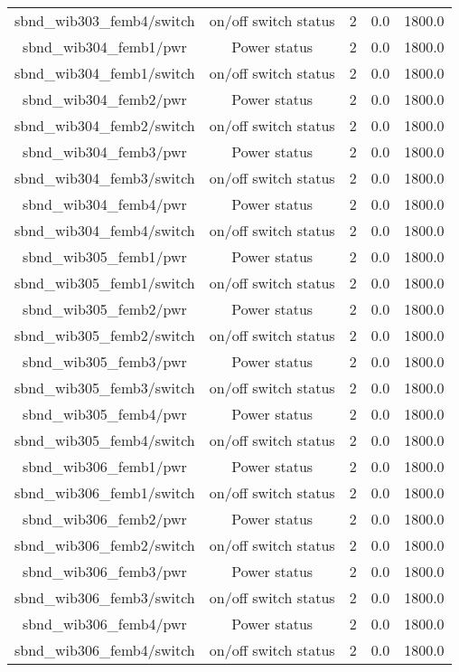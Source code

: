 \begin{table}[ptb]
\begin{tabular}{c | c c c c}
sbnd_wib303_femb4/switch & on/off switch status & 2 & 0.0 & 1800.0\\ 
sbnd_wib304_femb1/pwr & Power status & 2 & 0.0 & 1800.0\\ 
sbnd_wib304_femb1/switch & on/off switch status & 2 & 0.0 & 1800.0\\ 
sbnd_wib304_femb2/pwr & Power status & 2 & 0.0 & 1800.0\\ 
sbnd_wib304_femb2/switch & on/off switch status & 2 & 0.0 & 1800.0\\ 
sbnd_wib304_femb3/pwr & Power status & 2 & 0.0 & 1800.0\\ 
sbnd_wib304_femb3/switch & on/off switch status & 2 & 0.0 & 1800.0\\ 
sbnd_wib304_femb4/pwr & Power status & 2 & 0.0 & 1800.0\\ 
sbnd_wib304_femb4/switch & on/off switch status & 2 & 0.0 & 1800.0\\ 
sbnd_wib305_femb1/pwr & Power status & 2 & 0.0 & 1800.0\\ 
sbnd_wib305_femb1/switch & on/off switch status & 2 & 0.0 & 1800.0\\ 
sbnd_wib305_femb2/pwr & Power status & 2 & 0.0 & 1800.0\\ 
sbnd_wib305_femb2/switch & on/off switch status & 2 & 0.0 & 1800.0\\ 
sbnd_wib305_femb3/pwr & Power status & 2 & 0.0 & 1800.0\\ 
sbnd_wib305_femb3/switch & on/off switch status & 2 & 0.0 & 1800.0\\ 
sbnd_wib305_femb4/pwr & Power status & 2 & 0.0 & 1800.0\\ 
sbnd_wib305_femb4/switch & on/off switch status & 2 & 0.0 & 1800.0\\ 
sbnd_wib306_femb1/pwr & Power status & 2 & 0.0 & 1800.0\\ 
sbnd_wib306_femb1/switch & on/off switch status & 2 & 0.0 & 1800.0\\ 
sbnd_wib306_femb2/pwr & Power status & 2 & 0.0 & 1800.0\\ 
sbnd_wib306_femb2/switch & on/off switch status & 2 & 0.0 & 1800.0\\ 
sbnd_wib306_femb3/pwr & Power status & 2 & 0.0 & 1800.0\\ 
sbnd_wib306_femb3/switch & on/off switch status & 2 & 0.0 & 1800.0\\ 
sbnd_wib306_femb4/pwr & Power status & 2 & 0.0 & 1800.0\\ 
sbnd_wib306_femb4/switch & on/off switch status & 2 & 0.0 & 1800.0\\ 

\end{tabular}
\end{table}
